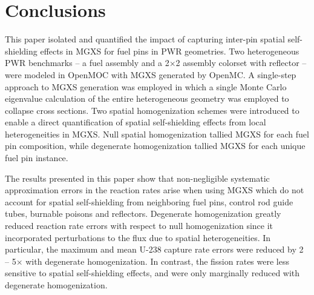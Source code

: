 \section{Conclusions}
\label{sec:conclusions}
  
This paper isolated and quantified the impact of capturing inter-pin spatial self-shielding effects in MGXS for fuel pins in PWR geometries. Two heterogeneous PWR benchmarks -- a fuel assembly and a 2$\times$2 assembly colorset with reflector -- were modeled in OpenMOC with MGXS generated by OpenMC. A single-step approach to MGXS generation was employed in which a single Monte Carlo eigenvalue calculation of the entire heterogeneous geometry was employed to collapse cross sections. Two spatial homogenization schemes were introduced to enable a direct quantification of spatial self-shielding effects from local heterogeneities in MGXS. Null spatial homogenization tallied MGXS for each fuel pin composition, while degenerate homogenization tallied MGXS for each unique fuel pin instance.


The results presented in this paper show that non-negligible systematic approximation errors in the reaction rates arise when using MGXS which do not account for spatial self-shielding from neighboring fuel pins, control rod guide tubes, burnable poisons and reflectors. Degenerate homogenization greatly reduced reaction rate errors with respect to null homogenization since it incorporated perturbations to the flux due to spatial heterogeneities. In particular, the maximum and mean U-238 capture rate errors were reduced by 2 -- 5$\times$ with degenerate homogenization. In contrast, the fission rates were less sensitive to spatial self-shielding effects, and were only marginally reduced with degenerate homogenization.


